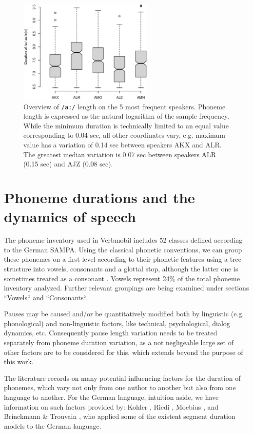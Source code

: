 \documentclass[a4paper]{scrreprt}
\begin{document}
\begin{figure}[htbp]
	\includegraphics[width=0.6\textwidth]{../Graphen/Duration_of_a_5speakers.eps}
	\centering
	\caption[Phoneme length variation between speakers]{Overview of \texttt{/a:/} length on the 5 most frequent speakers. Phoneme length is expressed as the natural logarithm of the sample frequency. While the minimum duration is technically limited to an equal value corresponding to 0.04 sec, all other coordinates vary, e.g. maximum value has a variation of 0.14 sec between speakers AKX and ALR. The greatest median variation is 0.07 sec between speakers ALR (0.15 sec) and AJZ (0.08 sec).}
	\label{fig:speaker_cmp}
\end{figure}

\chapter{Phoneme durations and the dynamics of speech}
The phoneme inventory used in Verbmobil includes 52 classes defined according to the German SAMPA. Using the classical phonetic conventions, we can group these phonemes on a first level according to their phonetic features using a tree structure into vowels, consonants and a glottal stop, although the latter one is sometimes treated as a consonant \cite{Kohler1995}. Vowels represent 24\% of the total phoneme inventory analyzed. Further relevant groupings are being examined under sections ``Vowels`` and ``Consonants``.

Pauses may be caused and/or be quantitatively modified both by linguistic (e.g. phonological) and non-linguistic factors, like technical, psychological, dialog dynamics, etc. Consequently pause length variation needs to be treated separately from phoneme duration variation, as a not negligeable large set of other factors are to be considered for this, which extends beyond the purpose of this work.

The literature records on many potential influencing factors for the duration of phonemes, which vary not only from one author to another but also from one language to another. For the German language, intuition aside, we have information on such factors provided by: Kohler \cite{Kohler1992}, Riedi \cite{Riedi1995}, Moebius \cite{Moebius1996}, and Brinckmann \& Trouvain \cite{Brinckmann_2003}, who applied some of the existent segment duration models to the German language.
\end{document}
